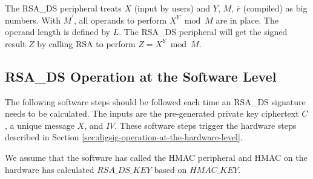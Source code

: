 \documentclass[main\_\_EN.tex]{subfiles}
\begin{document}
\begin{enumerate}
        The RSA\_DS peripheral treats \begin{math}X\end{math} (input by users) and \begin{math}Y\end{math}, \begin{math}M\end{math}, \begin{math}\overline{r}\end{math} (compiled) as big numbers. With \begin{math}M^{\prime}\end{math}, all operands to perform \begin{math} X^{Y} \bmod M\end{math} are in place. The operand length is defined by \begin{math}L\end{math}. The RSA\_DS peripheral will get the signed result \begin{math}Z\end{math} by calling RSA to perform \begin{math}Z = X^{Y} \bmod M\end{math}.

\end{enumerate}


\subsection{RSA\_DS Operation at the Software Level}

The following software steps should be followed each time an RSA\_DS signature needs to be calculated. The inputs are the pre-generated private key ciphertext \begin{math}C\end{math}, a unique message \begin{math}X\end{math}, and \begin{math}IV\end{math}. These software steps trigger the hardware steps described in Section \ref{sec:digsig-operation-at-the-hardware-level}.

We assume that the software has called the HMAC peripheral and HMAC on the hardware has calculated \begin{math}RSA\_DS\_KEY\end{math} based on \begin{math}HMAC\_KEY\end{math}.
\end{document}
